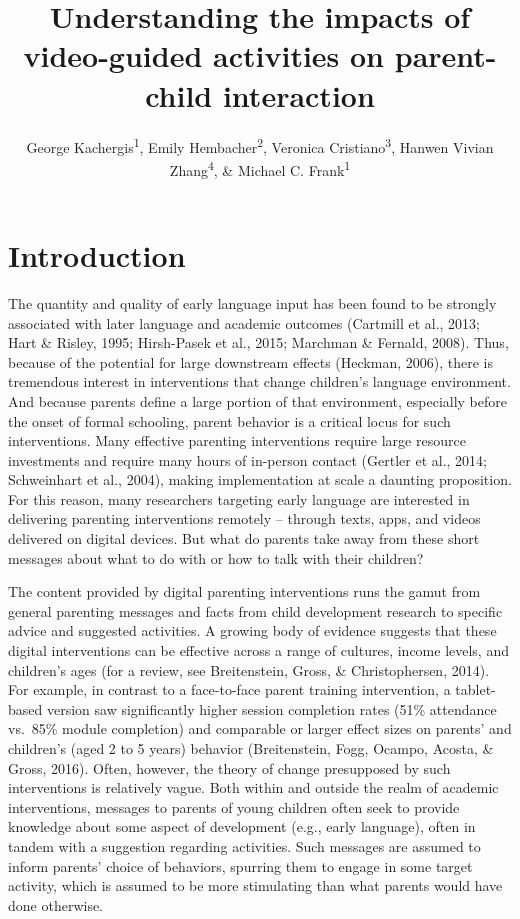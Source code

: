 \documentclass[man,floatsintext]{apa6}
\title{Understanding the impacts of video-guided activities on parent-child interaction}
\author{George Kachergis\textsuperscript{1}, Emily Hembacher\textsuperscript{2}, Veronica Cristiano\textsuperscript{3}, Hanwen Vivian Zhang\textsuperscript{4}, \& Michael C. Frank\textsuperscript{1}}
\date{}
\affiliation{
\vspace{0.5cm}
\textsuperscript{1} Department of Psychology, Stanford University\\\textsuperscript{2} Nextdoor, Inc.\\\textsuperscript{3} Gallaudet University\\\textsuperscript{4} Cornell University}
\begin{document}
\maketitle

\hypertarget{introduction}{%
\section{Introduction}\label{introduction}}

The quantity and quality of early language input has been found to be strongly associated with later language and academic outcomes (Cartmill et al., 2013; Hart \& Risley, 1995; Hirsh-Pasek et al., 2015; Marchman \& Fernald, 2008). Thus, because of the potential for large downstream effects (Heckman, 2006), there is tremendous interest in interventions that change children's language environment.
And because parents define a large portion of that environment, especially before the onset of formal schooling, parent behavior is a critical locus for such interventions.
Many effective parenting interventions require large resource investments and require many hours of in-person contact (Gertler et al., 2014; Schweinhart et al., 2004), making implementation at scale a daunting proposition.
For this reason, many researchers targeting early language are interested in delivering parenting interventions remotely -- through texts, apps, and videos delivered on digital devices.
But what do parents take away from these short messages about what to do with or how to talk with their children?

The content provided by digital parenting interventions runs the gamut from general parenting messages and facts from child development research to specific advice and suggested activities.
A growing body of evidence suggests that these digital interventions can be effective across a range of cultures, income levels, and children's ages (for a review, see Breitenstein, Gross, \& Christophersen, 2014).
For example, in contrast to a face-to-face parent training intervention, a tablet-based version saw significantly higher session completion rates (51\% attendance vs.~85\% module completion) and comparable or larger effect sizes on parents' and children's (aged 2 to 5 years) behavior (Breitenstein, Fogg, Ocampo, Acosta, \& Gross, 2016).
Often, however, the theory of change presupposed by such interventions is relatively vague.
Both within and outside the realm of academic interventions, messages to parents of young children often seek to provide knowledge about some aspect of development (e.g., early language), often in tandem with a suggestion regarding activities.
Such messages are assumed to inform parents' choice of behaviors, spurring them to engage in some target activity, which is assumed to be more stimulating than what parents would have done otherwise.
\end{document}
